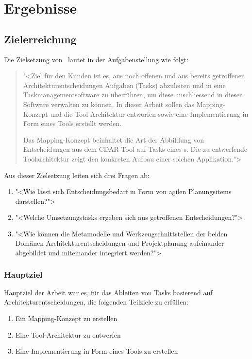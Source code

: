 \chapter{Ergebnisse}
	
	\section{Zielerreichung}
		Die Zielsetzung von \eeppi\ lautet in der Aufgabenstellung wie folgt:
		\begin{quote}
			"<Ziel für den Kunden ist es, aus noch offenen und aus bereits getroffenen Architekturentscheidungen  Aufgaben (Tasks) abzuleiten und in eine Taskmanagementsoftware zu überführen, um diese anschliessend in dieser Software verwalten zu können. In dieser Arbeit sollen das Mapping-Konzept und die Tool-Architektur entworfen sowie eine Implementierung in Form eines Tools erstellt werden.
			
			Das Mapping-Konzept beinhaltet die Art der Abbildung von Entscheidungen aus dem CDAR-Tool auf Tasks eines \ppt s. Die zu entwerfende Toolarchitektur zeigt den konkreten Aufbau einer solchen Applikation.">
		\end{quote}
		
	Aus dieser Zielsetzung leiten sich drei Fragen ab:
	\begin{enumerate}
		\item{"<Wie lässt sich Entscheidungsbedarf in Form von agilen Planungsitems darstellen?">}
		\item{"<Welche Umsetzungstasks ergeben sich aus getroffenen Entscheidungen?">}
		\item{"<Wie können die Metamodelle und Werkzeugschnittstellen der beiden Domänen Architekturentscheidungen und Projektplanung aufeinander abgebildet und miteinander integriert werden?">}
	\end{enumerate}
	
	\subsection{Hauptziel}
		Hauptziel der Arbeit war es, für das Ableiten von Tasks basierend auf Architekturentscheidungen, die folgenden Teilziele zu erfüllen:
		\begin{enumerate}
			\item{Ein Mapping-Konzept zu erstellen}
			\item{Eine Tool-Architektur zu entwerfen}
			\item{Eine Implementierung in Form eines Tools zu erstellen}
		\end{enumerate}
		
